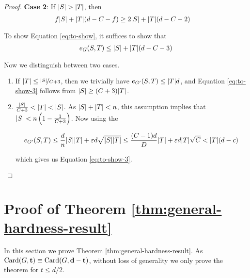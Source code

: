 \documentclass[11pt]{article}
\begin{document}
\begin{proof}
\textbf{Case 2}: If $\Size{S} > \Size{T}$, then 
  \begin{align}
    f\Size{S} +  \Size{T}(d-C-f)  &\ge 2\Size{S} +\Size{T}(d-C-2) \label{eq:to-show-2}
  \end{align}
  
  To show Equation \eqref{eq:to-show}, it suffices to show that
\begin{align}
  \CutEdges{S}{T}{G} \leq \Size{S} + \Size{T}(d-C-3) \label{eq:to-show-3}
\end{align}

Now we distinguish between two cases.

\begin{enumerate}

\item{
    If $\Size{T} \le \nicefrac{\Size{S}}{C+3}$, then we trivially have $\CutEdges{S}{T}{G'} \leq \Size{T}d$, and Equation \eqref{eq:to-show-3} follows from $\Size{S} \geq (C+3)\Size{T}$.
  }

\item{
$ \frac{\Size{S}}{C+3} < \Size{T} < \Size{S}$. As $\Size{S} + \Size{T} < n$, this assumption implies that $\Size{S} < n\left(1 - \frac{1}{C+3}\right)$.
Now using the 

\[ \CutEdges{S}{T}{G'} \le \frac{d}{n}\Size{S}\Size{T} + \epsilon d \sqrt{\Size{S}\Size{T}} \le \frac{(C-1)d}{D}\Size{T} + \epsilon d \Size{T}\sqrt{C} < \Size{T}(d-c)\]

which gives us Equation \eqref{eq:to-show-3}.
  }
  
\end{enumerate}
\end{proof}  



\section{Proof of Theorem \ref{thm:general-hardness-result}}
\label{sec:main-proof}

In this section we prove Theorem \ref{thm:general-hardness-result}. As $\Card{G, \vec{t}} \equiv \Card{G, \vec{d-t}}$, without loss of generality we only prove the theorem for $t \le d/2$. 
\end{document}
